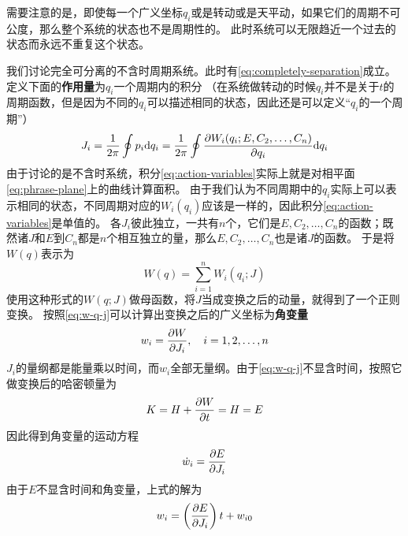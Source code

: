 \documentclass[UTF8, a4paper]{ctexart}
\begin{document}
需要注意的是，即使每一个广义坐标$q_i$或是转动或是天平动，如果它们的周期不可公度，那么整个系统的状态也不是周期性的。
此时系统可以无限趋近一个过去的状态而永远不重复这个状态。

我们讨论完全可分离的不含时周期系统。此时有\eqref{eq:completely-separation}成立。
定义下面的\textbf{作用量}为$q_i$一个周期内的积分
（在系统做转动的时候$q_i$并不是关于$t$的周期函数，但是因为不同的$q_i$可以描述相同的状态，因此还是可以定义“$q_i$的一个周期”）
\begin{equation}
    J_i = \frac{1}{2\pi} \oint p_i \dd q_i = \frac{1}{2\pi} \oint \pdv{W_i(q_i;E, C_2, \ldots, C_n)}{q_i} \dd q_i
    \label{eq:action-variables}
\end{equation}
由于讨论的是不含时系统，积分\eqref{eq:action-variables}实际上就是对相平面\eqref{eq:phrase-plane}上的曲线计算面积。
由于我们认为不同周期中的$q_i$实际上可以表示相同的状态，不同周期对应的$W_i(q_i)$应该是一样的，因此积分\eqref{eq:action-variables}是单值的。
各$J_i$彼此独立，一共有$n$个，它们是$E, C_2, \ldots, C_n$的函数；既然诸$J$和$E$到$C_n$都是$n$个相互独立的量，那么$E, C_2, \ldots, C_n$也是诸$J$的函数。
于是将$W(q)$表示为
\begin{equation}
    W(q) = \sum_{i=1}^n W_i (q_i;J)
    \label{eq:w-q-j}
\end{equation}
使用这种形式的$W(q;J)$做母函数，将$J$当成变换之后的动量，就得到了一个正则变换。
按照\eqref{eq:w-q-j}可以计算出变换之后的广义坐标为\textbf{角变量}
\begin{equation}
    w_i = \pdv{W}{J_i}, \quad i = 1, 2, \ldots, n
    \label{eq:ang-var}
\end{equation}
$J_i$的量纲都是能量乘以时间，而$w_i$全部无量纲。由于\eqref{eq:w-q-j}不显含时间，按照它做变换后的哈密顿量为
\[
    K = H + \pdv{W}{t} = H = E
\]
因此得到角变量的运动方程
\[
    \dot{w}_i = \pdv{E}{J_i}
\]
由于$E$不显含时间和角变量，上式的解为
\begin{equation}
    w_i = \left(\pdv{E}{J_i}\right) t + w_{i0}
    \label{eq:ang-var-evolution-linear}
\end{equation}
\end{document}
